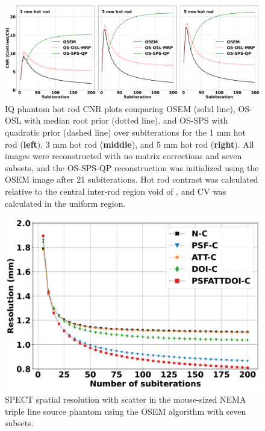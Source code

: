 \documentclass[utf8]{FrontiersinVancouver}
\begin{document}
\begin{figure}[ht!]
\begin{center}
\includegraphics[width=\textwidth]{Figures/HotRod_CNR}
\end{center}
\caption{IQ phantom hot rod CNR plots comparing OSEM (solid line), OS-OSL with median root prior (dotted line), and OS-SPS with quadratic prior (dashed line) over subiterations for the 1 mm hot rod (\textbf{left}), 3 mm hot rod (\textbf{middle}), and 5 mm hot rod (\textbf{right}). All images were reconstructed with no matrix corrections and seven subsets, and the OS-SPS-QP reconstruction was initialized using the OSEM image after 21 subiterations. Hot rod contrast was calculated relative to the central inter-rod region void of , and CV was calculated in the uniform  region.}
\label{fig:CNR}
\end{figure}


\begin{figure}[ht!]
\begin{center}
\includegraphics[width=0.49\linewidth]{Figures/Resolution}
\end{center}
\caption{SPECT spatial resolution with scatter in the mouse-sized NEMA triple line source phantom using the OSEM algorithm with seven subsets.}\label{fig:resolution}
\end{figure}
\end{document}
